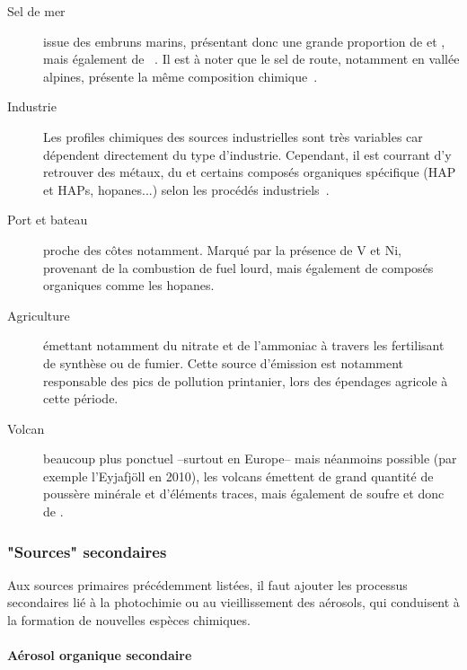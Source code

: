 \begin{description}
    \item[Sel de mer] issue des embruns marins, présentant donc une grande proportion de
         et , mais également de
        ~\autocite{belisCritical2013,odowdMarine1997,pioClimatology2007}. Il
        est à noter que le sel de route, notamment en vallée alpines, présente la même
        composition chimique~\autocite{airrhone-alpesInfluence2012}.

    \item[Industrie] Les profiles chimiques des sources industrielles sont très variables
        car dépendent directement du type d'industrie. Cependant, il est courrant d'y
        retrouver des métaux, du \SOq et certains composés organiques spécifique (HAP et
        HAPs, hopanes...) selon les procédés
        industriels~\autocite{sylvestreComprehensive2017}.

    \item[Port et bateau] proche des côtes notamment. Marqué par la présence de V et Ni,
        provenant de la combustion de fuel lourd, mais également de composés organiques
        comme les hopanes.

    \item[Agriculture] émettant notamment du nitrate et de l'ammoniac à travers les
        fertilisant de synthèse ou de fumier. Cette source d'émission est notamment
        responsable des pics de pollution printanier, lors des épendages agricole à cette
        période.

    \item[Volcan] beaucoup plus ponctuel --surtout en Europe-- mais néanmoins possible
        (par exemple l'Eyjafjöll en 2010), les volcans émettent de grand quantité de
        poussère minérale et d'éléments traces, mais également de soufre et donc de \SOq.

\end{description}

\subsubsection{"Sources" secondaires}%
\label{ssub:_sources_secondaires}

Aux sources primaires précédemment listées, il faut ajouter les processus secondaires lié
à la photochimie ou au vieillissement des aérosols, qui conduisent à la formation de
nouvelles espèces chimiques.

\paragraph{Aérosol organique secondaire}%
\label{par:aérosol_organique_secondaire}


